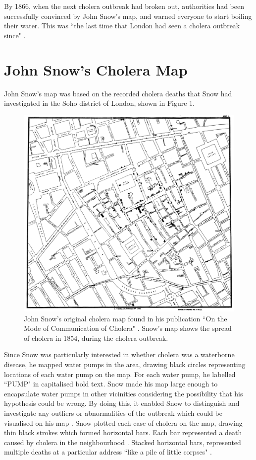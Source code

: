 \documentclass[12pt]{article}
\begin{document}
By 1866, when the next cholera outbreak had broken out, authorities had been successfully convinced by John Snow's map, and warned everyone to start boiling their water. This was ``the last time that London had seen a cholera outbreak since" \cite{tedtalk}.

\section{John Snow's Cholera Map}

John Snow's map was based on the recorded cholera deaths that Snow had investigated in the Soho district of London, shown in Figure 1.

\begin{figure}
\centering
\vspace*{-3cm}
\hspace*{-3cm} 
\includegraphics[scale=0.183]{images/Snow-cholera-map-1}
\caption{John Snow's original cholera map found in his publication ``On the Mode of Communication of Cholera" \cite{original}. Snow's map shows the spread of cholera in 1854, during the cholera outbreak. }
\label{fig:snow}
\end{figure}

Since Snow was particularly interested in whether cholera was a waterborne disease, he mapped water pumps in the area, drawing black circles representing locations of each water pump on the map. For each water pump, he labelled ``PUMP" in capitalised bold text. Snow made his map large enough to encapsulate water pumps in other vicinities considering the possibility that his hypothesis could be wrong. By doing this, it enabled Snow to distinguish and investigate any outliers or abnormalities of the outbreak which could be visualised on his map \cite{blog}. Snow plotted each case of cholera on the map, drawing thin black strokes which formed horizontal bars. Each bar represented a death caused by cholera in the neighbourhood \cite{tedtalk}. Stacked horizontal bars, represented multiple deaths at a particular address ``like a pile of little corpses" \cite{blog}.
\end{document}
